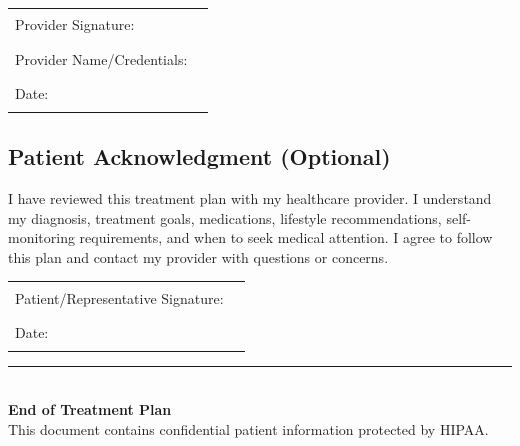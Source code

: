 \documentclass[11pt,letterpaper]{article}
\begin{document}
\vspace{1em}

\begin{tabular}{ll}
Provider Signature: & \rule{7cm}{0.5pt} \\[1em]
Provider Name/Credentials: & \rule{7cm}{0.5pt} \\[1em]
Date: & \rule{4cm}{0.5pt} \\[2em]
\end{tabular}

\subsection*{Patient Acknowledgment (Optional)}

I have reviewed this treatment plan with my healthcare provider. I understand my diagnosis, treatment goals, medications, lifestyle recommendations, self-monitoring requirements, and when to seek medical attention. I agree to follow this plan and contact my provider with questions or concerns.

\vspace{1em}

\begin{tabular}{ll}
Patient/Representative Signature: & \rule{7cm}{0.5pt} \\[1em]
Date: & \rule{4cm}{0.5pt} \\
\end{tabular}

\vspace{2em}
\begin{center}
\rule{\textwidth}{1pt}\\
\textbf{End of Treatment Plan}\\
This document contains confidential patient information protected by HIPAA.
\end{center}
\end{document}
